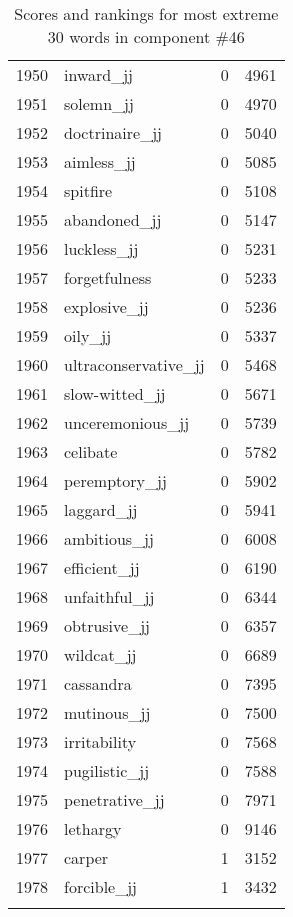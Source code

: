 \begin{longtable}[!htbp]{| rlr@{.}l |}
    1950 & inward\_jj & 0 & 4961 \\
    1951 & solemn\_jj & 0 & 4970 \\
    1952 & doctrinaire\_jj & 0 & 5040 \\
    1953 & aimless\_jj & 0 & 5085 \\
    1954 & spitfire & 0 & 5108 \\
    1955 & abandoned\_jj & 0 & 5147 \\
    1956 & luckless\_jj & 0 & 5231 \\
    1957 & forgetfulness & 0 & 5233 \\
    1958 & explosive\_jj & 0 & 5236 \\
    1959 & oily\_jj & 0 & 5337 \\
    1960 & ultraconservative\_jj & 0 & 5468 \\
    1961 & slow-witted\_jj & 0 & 5671 \\
    1962 & unceremonious\_jj & 0 & 5739 \\
    1963 & celibate & 0 & 5782 \\
    1964 & peremptory\_jj & 0 & 5902 \\
    1965 & laggard\_jj & 0 & 5941 \\
    1966 & ambitious\_jj & 0 & 6008 \\
    1967 & efficient\_jj & 0 & 6190 \\
    1968 & unfaithful\_jj & 0 & 6344 \\
    1969 & obtrusive\_jj & 0 & 6357 \\
    1970 & wildcat\_jj & 0 & 6689 \\
    1971 & cassandra & 0 & 7395 \\
    1972 & mutinous\_jj & 0 & 7500 \\
    1973 & irritability & 0 & 7568 \\
    1974 & pugilistic\_jj & 0 & 7588 \\
    1975 & penetrative\_jj & 0 & 7971 \\
    1976 & lethargy & 0 & 9146 \\
    1977 & carper & 1 & 3152 \\
    1978 & forcible\_jj & 1 & 3432 \\
    \hline
    \caption{Scores and rankings for most extreme 30 words in component \#46} \\
\end{longtable}
